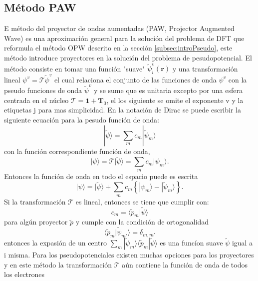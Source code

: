 \documentclass[12pt,a4paper, oneside]{book}
\begin{document}
   \subsection{M\'etodo PAW}\label{subsec:PAW}
   E m\'etodo del proyector de ondas aumentadas (PAW, Projector Augmented Wave) es una aproximaci\'on general para la soluci\'on del problema de DFT que reformula el m\'etodo OPW descrito en la secci\'on \ref{subsec:introPseudo}, este m\'etodo introduce proyectores en la soluci\'on del problema de pesudopotencial.
   \newline
   El m\'etodo consiste en tomar una funci\'on "suave" $\tilde{\psi}_i^v (\pmb{r})$ y una transformaci\'on lineal  $\psi^v = \mathcal{T} \tilde{\psi}^v  $ el cual relaciona el conjunto de las funciones de onda $\psi^v $ con la pseudo funciones de onda $ \tilde{\psi}^v$ y se sume que es unitaria excepto por una esfera centrada en el n\'ucleo $\mathcal{T} = \pmb{1}+ \pmb{T}_0$, el los siguiente se omite el exponente v y la etiquetas j para mas simplicidad. En la notaci\'on de Dirac se puede escribir la siguiente ecuaci\'on para la pesudo funci\'on de onda:
   \begin{equation}
   | \tilde{\psi} \rangle = \sum_m c_m | \tilde{\psi}_m \rangle \label{ec:DiracPseudo}
   \end{equation}
   con la funci\'on correspondiente funci\'on de onda,
   \begin{equation}
   |\psi \rangle = \mathcal{T} |\tilde{\psi} \rangle = \sum_m c_m | \psi_m \rangle. \label{ec:DiracAllE}
   \end{equation}
   Entonces la funci\'on de onda en todo el espacio puede es escrita 
   \begin{equation}
   | \psi \rangle = |\tilde{\psi} \rangle + \sum_m c_m \left\{|\psi_m \rangle - |\tilde{\psi}_m \rangle \right\}. \label{ec:DiracFunc}
   \end{equation}
   Si la transformaci\'on $\mathcal{T}$ es lineal, entonces se tiene que cumplir con:
   \begin{equation}
   	c_m = \langle \tilde{p}_m | \tilde{\psi} \rangle   \label{ec:condProj}
   \end{equation}
   para alg\'un proyector $\tilde{p}$ y cumple con la condici\'on de ortogonalidad
   \begin{equation}
   \langle \tilde{p}_m | \tilde{\psi}_{m'} \rangle = \delta_{m,m'} \label{ec:orotoDirac}
   \end{equation}
   entonces la expasi\'on de un centro $\sum_m |\tilde{\psi}_m \rangle \langle \tilde{p}_m | \tilde{\psi} \rangle $ es una func\'ion suave $\tilde{\psi}$ igual a i misma. Para los pseudopotenciales existen muchas opciones para los proyectores y en este m\'etodo la transformaci\'on $\mathcal{T}$ a\'un contiene la funci\'on de onda de todos los electrones
\end{document}
